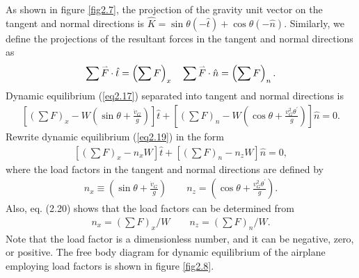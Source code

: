 \documentclass{AeroStructure-ERJohnson}
\def\harp#1{\smash{\mathord{\buildrel{\lower3pt\hbox{$\scriptscriptstyle\rightharpoonup$}}\over{#1}}}}
\begin{document}
\noindent As shown in figure \ref{fig2.7}, the projection of the gravity unit vector on the tangent and normal directions is $\hat{K}=\sin \theta(-\hat{t})+\cos \theta(-\hat{n})$. Similarly, we define the projections of the resultant forces in the tangent and normal directions as
\begin{align}\label{eq2.18}
\sum \harp{F} \cdot \hat{t}=\left(\sum F\right)_{x} \quad \sum \harp{F} \cdot \hat{n}=\left(\sum F\right)_{n}.
\end{align}
Dynamic equilibrium (\ref{eq2.17}) separated into tangent and normal directions is
\begin{align}\label{eq2.19}
\left[\left(\sum F\right)_{x}-W\left(\sin \theta+\frac{\dot{v}_{G}}{g}\right)\right] \hat{t}+\left[\left(\sum F\right)_{n}-W\left(\cos \theta+\frac{v_{G}^{2} \theta^{\prime}}{g}\right)\right] \hat{n}=0.
\end{align}
Rewrite dynamic equilibrium (\ref{eq2.19}) in the form
\begin{align}\label{eq2.20}
\left[\left(\sum F\right)_{x}-n_{x} W\right] \hat{t}+\left[\left(\sum F\right)_{n}-n_{z} W\right] \hat{n}=0,
\end{align}
where the load factors in the tangent and normal directions are defined by
\begin{align}\label{eq2.21}
\boxed{n_{x} \equiv\left(\sin \theta+\frac{\dot{v}_{G}}{g}\right) \qquad n_{z}=\left(\cos \theta+\frac{v_{G}^{2} \theta^{\prime}}{g}\right).}
\end{align}
Also, eq. (2.20) shows that the load factors can be determined from
\begin{align}\label{eq2.22}
\boxed{n_{x}=\left(\sum F\right)_{x}/W \qquad n_{z}=\left(\sum F\right)_{n}/W.}
\end{align}
Note that the load factor is a dimensionless number, and it can be negative, zero, or positive. The free body diagram for dynamic equilibrium of the airplane employing load factors is shown in figure \ref{fig2.8}.

{\def\thefigure{2.8}
}
\end{document}
